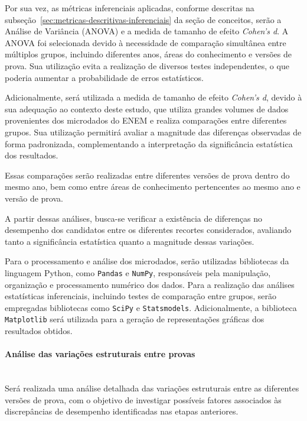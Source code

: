 \documentclass[a4paper,10pt, twocolumn]{article}
\begin{document}
Por sua vez, as métricas inferenciais aplicadas, conforme descritas na
subseção~\ref{sec:metricas-descritivas-inferenciais} da seção de conceitos, serão a Análise de Variância (ANOVA) e a medida de tamanho de efeito \textit{Cohen's d}. A ANOVA foi selecionada devido à necessidade de comparação simultânea entre múltiplos grupos, incluindo diferentes anos, áreas do conhecimento e versões de prova. Sua utilização evita a realização de diversos testes independentes, o que poderia aumentar a probabilidade de erros estatísticos.

Adicionalmente, será utilizada a medida de tamanho de efeito \textit{Cohen's d}, devido à sua adequação ao contexto deste estudo, que utiliza grandes volumes de dados provenientes dos microdados do ENEM e realiza comparações entre diferentes grupos. Sua utilização permitirá avaliar a magnitude das diferenças observadas de forma padronizada, complementando a interpretação da significância estatística dos resultados.

Essas comparações serão realizadas entre diferentes versões de prova dentro do mesmo ano, bem como entre áreas de conhecimento pertencentes ao mesmo ano e versão de prova.

A partir dessas análises, busca-se verificar a existência de diferenças no desempenho dos candidatos entre os diferentes recortes considerados, avaliando tanto a significância estatística quanto a magnitude dessas variações.

Para o processamento e análise dos microdados, serão utilizadas bibliotecas da linguagem Python, como \texttt{Pandas} e \texttt{NumPy}, responsáveis pela manipulação, organização e processamento numérico dos dados. Para a realização das análises estatísticas inferenciais, incluindo testes de comparação entre grupos, serão empregadas bibliotecas como \texttt{SciPy} e \texttt{Statsmodels}. Adicionalmente, a biblioteca \texttt{Matplotlib} será utilizada para a geração de representações gráficas dos resultados obtidos.

\paragraph{Análise das variações estruturais entre provas}
\mbox{}\\
Será realizada uma análise detalhada das variações estruturais entre as diferentes versões de prova, com o objetivo de investigar possíveis fatores associados às discrepâncias de desempenho identificadas nas etapas anteriores.
\end{document}
